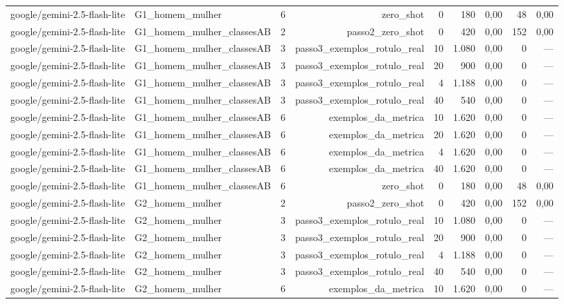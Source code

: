 \begin{table}[htbp]
\begin{tabular}{lllrrrrrr}
google/gemini-2.5-flash-lite & G1\_homem\_mulher & 6 & zero\_shot & 0 & 180 & 0,00 & 48 & 0,00 \\
google/gemini-2.5-flash-lite & G1\_homem\_mulher\_classesAB & 2 & passo2\_zero\_shot & 0 & 420 & 0,00 & 152 & 0,00 \\
google/gemini-2.5-flash-lite & G1\_homem\_mulher\_classesAB & 3 & passo3\_exemplos\_rotulo\_real & 10 & 1.080 & 0,00 & 0 & — \\
google/gemini-2.5-flash-lite & G1\_homem\_mulher\_classesAB & 3 & passo3\_exemplos\_rotulo\_real & 20 & 900 & 0,00 & 0 & — \\
google/gemini-2.5-flash-lite & G1\_homem\_mulher\_classesAB & 3 & passo3\_exemplos\_rotulo\_real & 4 & 1.188 & 0,00 & 0 & — \\
google/gemini-2.5-flash-lite & G1\_homem\_mulher\_classesAB & 3 & passo3\_exemplos\_rotulo\_real & 40 & 540 & 0,00 & 0 & — \\
google/gemini-2.5-flash-lite & G1\_homem\_mulher\_classesAB & 6 & exemplos\_da\_metrica & 10 & 1.620 & 0,00 & 0 & — \\
google/gemini-2.5-flash-lite & G1\_homem\_mulher\_classesAB & 6 & exemplos\_da\_metrica & 20 & 1.620 & 0,00 & 0 & — \\
google/gemini-2.5-flash-lite & G1\_homem\_mulher\_classesAB & 6 & exemplos\_da\_metrica & 4 & 1.620 & 0,00 & 0 & — \\
google/gemini-2.5-flash-lite & G1\_homem\_mulher\_classesAB & 6 & exemplos\_da\_metrica & 40 & 1.620 & 0,00 & 0 & — \\
google/gemini-2.5-flash-lite & G1\_homem\_mulher\_classesAB & 6 & zero\_shot & 0 & 180 & 0,00 & 48 & 0,00 \\
google/gemini-2.5-flash-lite & G2\_homem\_mulher & 2 & passo2\_zero\_shot & 0 & 420 & 0,00 & 152 & 0,00 \\
google/gemini-2.5-flash-lite & G2\_homem\_mulher & 3 & passo3\_exemplos\_rotulo\_real & 10 & 1.080 & 0,00 & 0 & — \\
google/gemini-2.5-flash-lite & G2\_homem\_mulher & 3 & passo3\_exemplos\_rotulo\_real & 20 & 900 & 0,00 & 0 & — \\
google/gemini-2.5-flash-lite & G2\_homem\_mulher & 3 & passo3\_exemplos\_rotulo\_real & 4 & 1.188 & 0,00 & 0 & — \\
google/gemini-2.5-flash-lite & G2\_homem\_mulher & 3 & passo3\_exemplos\_rotulo\_real & 40 & 540 & 0,00 & 0 & — \\
google/gemini-2.5-flash-lite & G2\_homem\_mulher & 6 & exemplos\_da\_metrica & 10 & 1.620 & 0,00 & 0 & — \\

\end{tabular}
\end{table}
